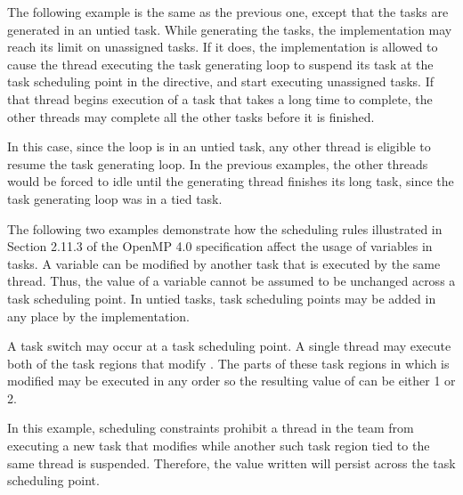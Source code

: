 

The following example is the same as the previous one, except that the tasks are 
generated in an untied task. While generating the tasks, the implementation may 
reach its limit on unassigned tasks. If it does, the implementation is allowed 
to cause the thread executing the task generating loop to suspend its task at the 
task scheduling point in the  directive, and start executing unassigned 
tasks.  If that thread begins execution of a task that takes a long time to complete, 
the other threads may complete all the other tasks before it is finished.

In this case, since the loop is in an untied task, any other thread is eligible 
to resume the task generating loop. In the previous examples, the other threads 
would be forced to idle until the generating thread finishes its long task, since 
the task generating loop was in a tied task.



The following two examples demonstrate how the scheduling rules illustrated in 
Section 2.11.3 of the OpenMP 4.0 specification affect the usage of 
 variables in tasks. A  
variable can be modified by another task that is executed by the same thread. Thus, 
the value of a  variable cannot be assumed to be unchanged 
across a task scheduling point. In untied tasks, task scheduling points may be 
added in any place by the implementation.

A task switch may occur at a task scheduling point. A single thread may execute 
both of the task regions that modify . The parts of these task regions 
in which  is modified may be executed in any order so the resulting 
value of  can be either 1 or 2.




In this example, scheduling constraints prohibit a thread in the team from executing 
a new task that modifies   while another such task region tied to the 
same thread is suspended. Therefore, the value written will persist across the 
task scheduling point.




